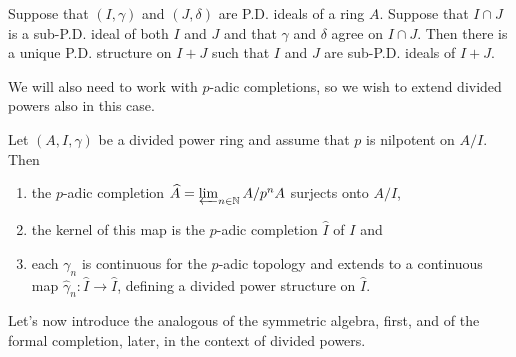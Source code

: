 \begin{prop}\label{lem:PDExt2}
	Suppose that $\left(I, \gamma\right)$ and $\left(J, \delta\right)$ are
	P.D. ideals of a ring $A$.
	Suppose that $I \cap J$ is a sub-P.D. ideal of both
	$I$ and $J$ and that $\gamma$ and $\delta$ agree on
	$I \cap J$.
	Then there is a unique P.D. structure on $I+J$
	such that $I$ and $J$ are sub-P.D. ideals of $I+J$.
\end{prop}


\noindent
We will also need to work with $p$-adic completions, so we wish
to extend divided powers also in this case.
\begin{lem}
	\label{PDExtendCompletion}
	Let $\left(A, I, \gamma\right)$ be a divided power ring and assume
	that $p$ is nilpotent on $A/I$.
	Then
\begin{enumerate}
	\item the $p$-adic completion $\widehat{A} = \varprojlim_{n \in \mathbb{N}}
		A/p^nA$ surjects onto $A/I$,
	\item the kernel of this map is the $p$-adic completion $\widehat{I}$
		of $I$ and
	\item each $\gamma_n$ is continuous for the $p$-adic topology and extends
		to a continuous map $\widehat{\gamma}_n\colon \widehat{I} \to \widehat{I}$,
		defining a divided power structure on $\widehat{I}$.
\end{enumerate}
\end{lem} 


\noindent
Let's now introduce the analogous of the symmetric algebra, first,
and of the formal completion, later,
in the context of divided powers.


